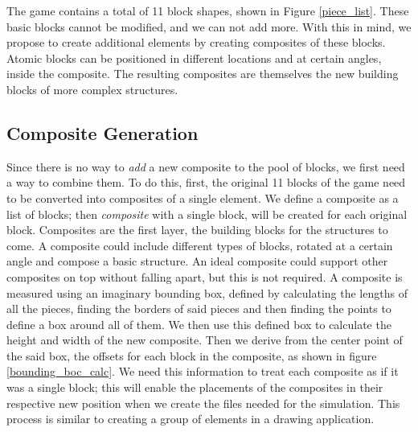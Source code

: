 \documentclass[conference]{IEEEtran}
\begin{document}
The game contains a total of 11 block shapes, shown in Figure
\ref{piece_list}. These basic blocks cannot be modified, and we can not add
more. With this in mind, we propose to create additional elements by creating
composites of these blocks. Atomic blocks can be positioned in different
locations and at certain angles, inside the composite. The resulting composites
are themselves the new building blocks of more complex structures. 
    
\subsection{Composite Generation}

Since there is no way to \textit{add} a new composite to the pool of blocks, we
first need a way to combine them. To do this, first, the original 11 blocks of
the game need to be converted into composites of a single element.  We define a
composite as a list of blocks; then  \textit{composite} with a single block,
will be created for each original block. Composites are the first layer, the
building blocks for the structures to come. A composite could include different
types of blocks, rotated at a certain angle and compose a basic structure. An
ideal composite could support other composites on top without falling apart, but
this is not required. A composite is measured using an imaginary bounding box,
defined by calculating the lengths of all the pieces, finding the borders of
said pieces and then finding the points to define a box around all of them. We
then use this defined box to calculate the height and width of the new
composite. Then we derive from the center point of the said box, the offsets for
each block in the composite, as shown in figure \ref{bounding_boc_calc}. We need
this information to treat each composite as if it was a single block; this will
enable the placements of the composites in their respective new position when we
create the files needed for the simulation. This process is similar to creating
a group of elements in a drawing application.
\end{document}
